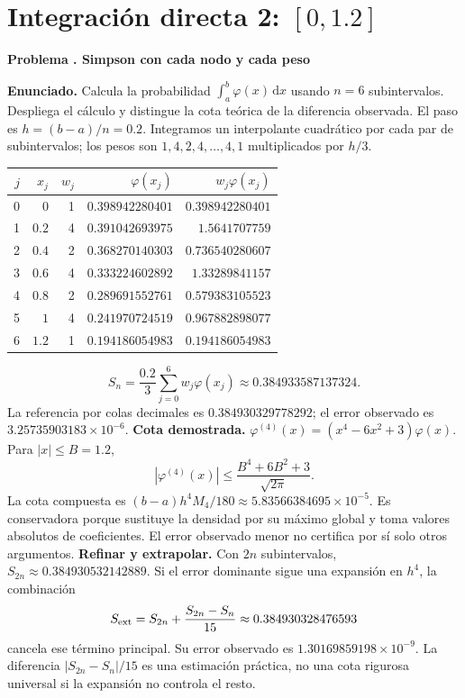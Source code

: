 \documentclass[11pt,a4paper]{article}
\newcommand{\dd}{\,\mathrm d}
\theoremstyle{definition}
\newcounter{problema}
\newenvironment{resuelto}[1]{\refstepcounter{problema}\par\medskip\Needspace{6\baselineskip}\textbf{Problema \theproblema. #1}\par}{\par\medskip}
\begin{document}
\section{\texorpdfstring{Integración directa 2: $[0,1.2]$}{Integración directa 2: [0,1.2]}}
\begin{resuelto}{Simpson con cada nodo y cada peso}
\textbf{Enunciado.} Calcula la probabilidad $\int_a^b\varphi(x)\dd x$ usando $n=6$ subintervalos. Despliega el cálculo y distingue la cota teórica de la diferencia observada.
El paso es $h=(b-a)/n=0.2$. Integramos un interpolante cuadrático por cada par de subintervalos; los pesos son $1,4,2,4,\ldots,4,1$ multiplicados por $h/3$.

\begin{center}\small\begin{tabular}{rrrrr}
\toprule
$j$&$x_j$&$w_j$&$\varphi(x_j)$&$w_j\varphi(x_j)$\\
\midrule
0&$0$&1&$0.398942280401$&$0.398942280401$\\
1&$0.2$&4&$0.391042693975$&$1.5641707759$\\
2&$0.4$&2&$0.368270140303$&$0.736540280607$\\
3&$0.6$&4&$0.333224602892$&$1.33289841157$\\
4&$0.8$&2&$0.289691552761$&$0.579383105523$\\
5&$1$&4&$0.241970724519$&$0.967882898077$\\
6&$1.2$&1&$0.194186054983$&$0.194186054983$\\
\bottomrule\end{tabular}\end{center}
\[
S_n=\frac{0.2}{3}\sum_{j=0}^{6}w_j\varphi(x_j)\approx0.384933587137324.
\]
La referencia por colas decimales es $0.384930329778292$; el error observado es $3.25735903183\times10^{-6}$.
\textbf{Cota demostrada.} $\varphi^{(4)}(x)=(x^4-6x^2+3)\varphi(x)$. Para $|x|\le B=1.2$,
\[
|\varphi^{(4)}(x)|\le\frac{B^4+6B^2+3}{\sqrt{2\pi}}.
\]
La cota compuesta es $(b-a)h^4M_4/180\approx5.83566384695\times10^{-5}$. Es conservadora porque sustituye la densidad por su máximo global y toma valores absolutos de coeficientes. El error observado menor no certifica por sí solo otros argumentos.
\textbf{Refinar y extrapolar.} Con $2n$ subintervalos, $S_{2n}\approx0.384930532142889$. Si el error dominante sigue una expansión en $h^4$, la combinación
\[
S_{\rm ext}=S_{2n}+\frac{S_{2n}-S_n}{15}\approx0.384930328476593
\]
cancela ese término principal. Su error observado es $1.30169859198\times10^{-9}$. La diferencia $|S_{2n}-S_n|/15$ es una estimación práctica, no una cota rigurosa universal si la expansión no controla el resto.
\end{resuelto}
\end{document}

